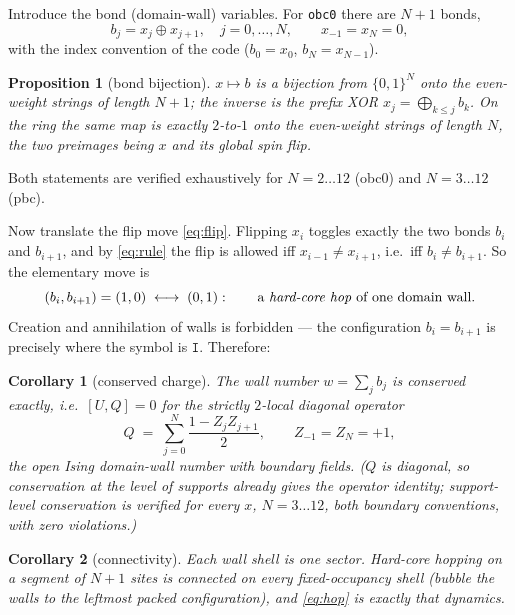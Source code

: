 \documentclass[11pt]{article}
\newcommand{\rt}[1]{\texttt{#1}}
\theoremstyle{plain}
\newtheorem{proposition}{Proposition}
\newtheorem{corollary}{Corollary}
\theoremstyle{definition}
\begin{document}
Introduce the bond (domain-wall) variables. For \rt{obc0} there are $N+1$ bonds,
\begin{equation}
  b_j = x_j \oplus x_{j+1}, \quad j = 0,\dots,N,
  \qquad x_{-1} = x_N = 0 ,
\end{equation}
with the index convention of the code ($b_0 = x_0$, $b_N = x_{N-1}$).

\begin{proposition}[bond bijection]\label{prop:bij}
$x \mapsto b$ is a bijection from $\{0,1\}^N$ onto the even-weight strings of
length $N+1$; the inverse is the prefix XOR $x_j = \bigoplus_{k\le j} b_k$. On
the ring the same map is exactly $2$-to-$1$ onto the even-weight strings of
length $N$, the two preimages being $x$ and its global spin flip.
\end{proposition}
Both statements are verified exhaustively for $N = 2\ldots12$ (obc0) and
$N=3\ldots12$ (pbc).

Now translate the flip move \eqref{eq:flip}. Flipping $x_i$ toggles exactly the
two bonds $b_i$ and $b_{i+1}$, and by \eqref{eq:rule} the flip is allowed iff
$x_{i-1}\neq x_{i+1}$, i.e.\ iff $b_i \neq b_{i+1}$. So the elementary move is
\begin{equation}
  (b_i, b_{i+1}) = (1,0) \;\longleftrightarrow\; (0,1) :
  \qquad\text{a \emph{hard-core hop} of one domain wall.}
  \label{eq:hop}
\end{equation}
Creation and annihilation of walls is forbidden --- the configuration
$b_i = b_{i+1}$ is precisely where the symbol is $\rt{I}$. Therefore:

\begin{corollary}[conserved charge]\label{cor:charge}
The wall number $w=\sum_j b_j$ is conserved exactly, i.e.\ $[U,Q]=0$ for the
strictly $2$-local diagonal operator
\begin{equation}
  Q \;=\; \sum_{j=0}^{N} \frac{1 - Z_jZ_{j+1}}{2},
  \qquad Z_{-1} = Z_{N} = +1 ,
\end{equation}
the open Ising domain-wall number with boundary fields. ($Q$ is diagonal, so
conservation at the level of supports already gives the operator identity;
support-level conservation is verified for every $x$, $N=3\ldots12$, both
boundary conventions, with zero violations.)
\end{corollary}

\begin{corollary}[connectivity]\label{cor:conn}
Each wall shell is one sector. Hard-core hopping on a segment of $N+1$ sites is
connected on every fixed-occupancy shell (bubble the walls to the leftmost packed
configuration), and \eqref{eq:hop} is exactly that dynamics.
\end{corollary}
\end{document}
